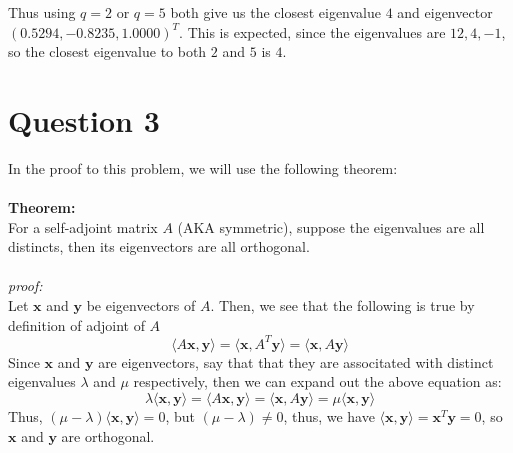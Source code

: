 \documentclass[11pt]{article}
\begin{document}
Thus using $ q = 2$ or $ q = 5$ both give us the closest eigenvalue $\boxed{4}$ and eigenvector $ \boxed{(0.5294,-0.8235,1.0000)^T}$. This is expected, since the eigenvalues are $ 12,4,-1$, so the closest eigenvalue to both $2$ and $5$ is $4$.


\section*{Question 3}
In the proof to this problem, we will use the following theorem:\\\\
\textbf{Theorem:}\\
For a self-adjoint matrix $A$ (AKA symmetric), suppose the eigenvalues are all distincts, then its eigenvectors are all orthogonal.\\\\
\textit{proof:}\\
Let $\mathbf{x}$ and $\mathbf{y}$ be eigenvectors of $A$. Then, we see that the following is true by definition of adjoint of $A$
\[ \langle A\mathbf{x}, \mathbf{y} \rangle = \langle \mathbf{x}, A^T\mathbf{y} \rangle = \langle \mathbf{x}, A\mathbf{y} \rangle\]
Since $\mathbf{x}$ and $\mathbf{y}$ are eigenvectors, say that that they are associtated with distinct eigenvalues $\lambda$ and $\mu$ respectively, then we can expand out the above equation as:
\[ \lambda\langle \mathbf{x}, \mathbf{y} \rangle  =  \langle A\mathbf{x}, \mathbf{y} \rangle = \langle \mathbf{x}, A\mathbf{y} \rangle = \mu \langle \mathbf{x}, \mathbf{y} \rangle \]
Thus, $ (\mu - \lambda)\langle \mathbf{x}, \mathbf{y} \rangle = 0$, but $(\mu -\lambda) \neq 0 $, thus, we have $\langle \mathbf{x}, \mathbf{y} \rangle = \mathbf{x}^T\mathbf{y} = 0$, so $\mathbf{x}$ and $\mathbf{y}$ are orthogonal. \\\\
\end{document}
